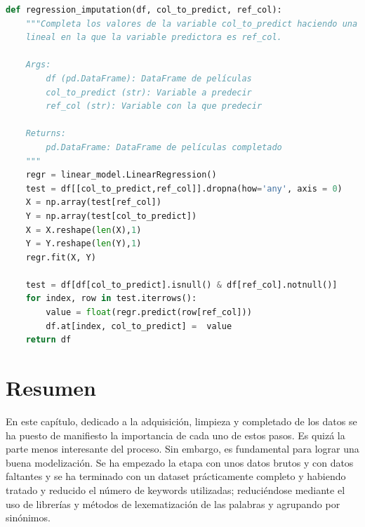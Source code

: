 \begin{lstlisting}[language=Python, caption=Imputación de una variable mediante regresión lineal con otra., label ={lst:linreg}]
 def regression_imputation(df, col_to_predict, ref_col):
    """Completa los valores de la variable col_to_predict haciendo una regresión
    lineal en la que la variable predictora es ref_col.

    Args:
        df (pd.DataFrame): DataFrame de películas
        col_to_predict (str): Variable a predecir
        ref_col (str): Variable con la que predecir

    Returns:
        pd.DataFrame: DataFrame de películas completado
    """
    regr = linear_model.LinearRegression()
    test = df[[col_to_predict,ref_col]].dropna(how='any', axis = 0)
    X = np.array(test[ref_col])
    Y = np.array(test[col_to_predict])
    X = X.reshape(len(X),1)
    Y = Y.reshape(len(Y),1)
    regr.fit(X, Y)

    test = df[df[col_to_predict].isnull() & df[ref_col].notnull()]
    for index, row in test.iterrows():
        value = float(regr.predict(row[ref_col]))
        df.at[index, col_to_predict] =  value
    return df
\end{lstlisting}

\section{Resumen}

En este capítulo, dedicado a la adquisición, limpieza y completado de los datos se ha puesto de manifiesto la importancia de cada uno de estos pasos. Es quizá la parte menos interesante del proceso. Sin embargo, es fundamental para lograr una buena modelización. Se ha empezado la etapa con unos datos brutos y con datos faltantes y se ha terminado con un dataset prácticamente completo y habiendo tratado y reducido el número de keywords utilizadas; reduciéndose mediante el uso de librerías y métodos de lexematización de las palabras y agrupando por sinónimos.